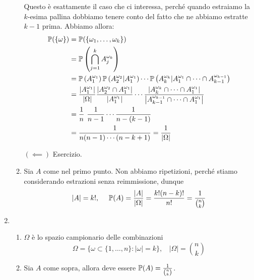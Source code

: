 \begin{enumerate}
\begin{enumerate}
		\begin{oss}
			Questo è esattamente il caso che ci interessa, perché quando estraiamo la $k$-esima pallina dobbiamo tenere conto del fatto che ne abbiamo estratte $k-1$ prima. Abbiamo allora:
			\begin{align*}
				\mathbb{P}(\{\omega \}) & =\mathbb{P}(\{\omega _{1} ,\dots ,\omega _{k}\})\\
				 & =\mathbb{P}\left(\bigcap _{j=1}^{k} A_{j}^{\omega _{k}}\right)\\
				 & =\mathbb{P}\left(A_{1}^{\omega _{1}}\right)\mathbb{P}\left(A_{2}^{\omega _{2}} |A_{1}^{\omega _{1}}\right) \cdots \mathbb{P}\left(A_{k}^{\omega _{k}} |A_{1}^{\omega _{1}} \cap \cdots \cap A_{k-1}^{\omega _{k-1}}\right)\\
				 & =\frac{\left| A_{1}^{\omega _{1}}\right| }{| \Omega | }\frac{\left| A_{2}^{\omega _{2}} \cap A_{1}^{\omega _{1}}\right| }{\left| A_{1}^{\omega _{1}}\right| } \cdots \frac{| A_{k}^{\omega _{k}} \cap \cdots \cap A_{1}^{\omega _{1}} |}{\left| A_{k-1}^{\omega _{k-1}} \cap \cdots \cap A_{1}^{\omega _{1}}\right| }\\
				 & =\frac{1}{n} \ \frac{1}{n-1} \cdots \frac{1}{n-(k-1)}\\
				 & =\frac{1}{n(n-1) \cdots (n-k+1)} =\frac{1}{| \Omega | }
			\end{align*}
		\end{oss}

		$(\impliedby)$ Esercizio.
		\item Sia $A$ come nel primo punto. Non abbiamo ripetizioni, perché stiamo considerando estrazioni senza reimmissione, dunque
		\begin{equation*}
			| A| =k!,\ \ \ \ \mathbb{P}(A) =\frac{| A| }{| \Omega | } =\frac{k!(n-k) !}{n!} =\frac{1}{\binom{n}{k}}
		\end{equation*}
	\end{enumerate}
	\item 
	\begin{enumerate}
		\item $\Omega $ è lo spazio campionario delle combinazioni
		\begin{equation*}
			\Omega =\{\omega \subset \{1,\dots ,n\} :| \omega | =k\} ,\ \ \ \ | \Omega | =\binom{n}{k}
		\end{equation*}
		\item Sia $A$ come sopra, allora deve essere $\mathbb{P}(A) =\frac{1}{\binom{n}{k}}$.
	\end{enumerate}
\end{enumerate}

